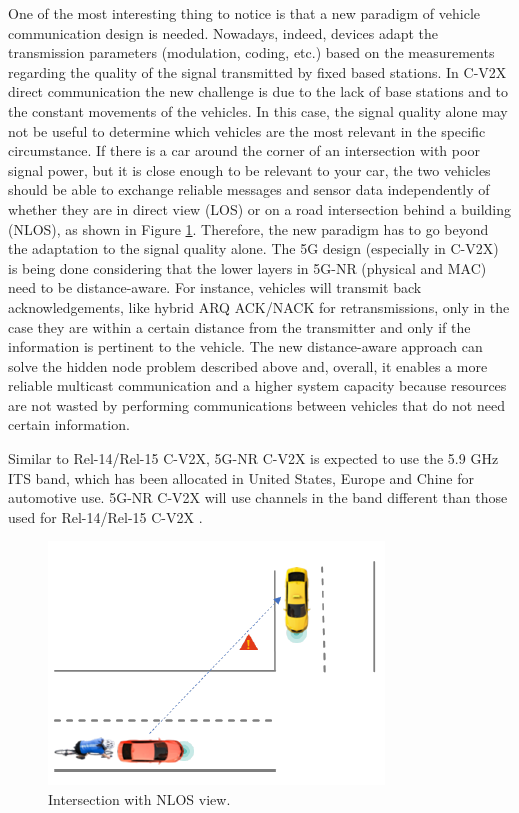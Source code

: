 \documentclass[conference,12pt,onecolumn]{IEEEtran}
\begin{document}
One of the most interesting thing to notice is that a new paradigm of vehicle communication design is needed. Nowadays, indeed, devices adapt the transmission parameters (modulation, coding, etc.) based on the measurements regarding the quality of the signal transmitted by fixed based stations. In C-V2X direct communication the new challenge is due to the lack of base stations and to the constant movements of the vehicles. In this case, the signal quality alone may not be useful to determine which vehicles are the most relevant in the specific circumstance. If there is a car around the corner of an intersection with poor signal power, but it is close enough to be relevant to your car, the two vehicles should be able to exchange reliable messages and sensor data independently of whether they are in direct view (LOS) or on a road intersection behind a building (NLOS), as shown in Figure \ref{fig:intersection}. Therefore, the new paradigm has to go beyond the adaptation to the signal quality alone. The 5G design (especially in C-V2X) is being done considering that the lower layers in 5G-NR (physical and MAC) need to be distance-aware. For instance, vehicles will transmit back acknowledgements, like hybrid ARQ ACK/NACK for retransmissions, only in the case they are within a certain distance from the transmitter and only if the information is pertinent to the vehicle. The new distance-aware approach can solve the hidden node problem described above and, overall, it enables a more reliable multicast communication and a higher system capacity because resources are not wasted by performing communications between vehicles that do not need certain information.

Similar to Rel-14/Rel-15 C-V2X, 5G-NR C-V2X is expected to use the 5.9 GHz ITS band, which has been allocated in United States, Europe and Chine for automotive use. 5G-NR C-V2X will use channels in the band different than those used for Rel-14/Rel-15 C-V2X \cite{5GAAwhite}.

\begin{figure} [ht]
   \centering
  \includegraphics[width=0.5\linewidth]{_Graphics/intersection.png}
  \caption{Intersection with NLOS view. \cite{5gamericas2018}}
  \label{fig:intersection}
\end{figure}
\end{document}
